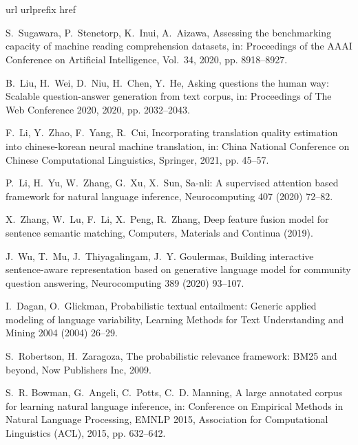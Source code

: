 \documentclass[review]{elsarticle}
\begin{document}
\section*{}
\begin{thebibliography}{10}
\expandafter\ifx\csname url\endcsname\relax
  \def\url#1{\texttt{#1}}\fi
\expandafter\ifx\csname urlprefix\endcsname\relax\def\urlprefix{URL }\fi
\expandafter\ifx\csname href\endcsname\relax
  \def\href#1#2{#2} \def\path#1{#1}\fi

S.~Sugawara, P.~Stenetorp, K.~Inui, A.~Aizawa, Assessing the benchmarking
  capacity of machine reading comprehension datasets, in: Proceedings of the
  AAAI Conference on Artificial Intelligence, Vol.~34, 2020, pp. 8918--8927.

B.~Liu, H.~Wei, D.~Niu, H.~Chen, Y.~He, Asking questions the human way:
  Scalable question-answer generation from text corpus, in: Proceedings of The
  Web Conference 2020, 2020, pp. 2032--2043.

F.~Li, Y.~Zhao, F.~Yang, R.~Cui, Incorporating translation quality estimation
  into chinese-korean neural machine translation, in: China National Conference
  on Chinese Computational Linguistics, Springer, 2021, pp. 45--57.

P.~Li, H.~Yu, W.~Zhang, G.~Xu, X.~Sun, Sa-nli: A supervised attention based
  framework for natural language inference, Neurocomputing 407 (2020) 72--82.

X.~Zhang, W.~Lu, F.~Li, X.~Peng, R.~Zhang, Deep feature fusion model for
  sentence semantic matching, Computers, Materials and Continua (2019).

J.~Wu, T.~Mu, J.~Thiyagalingam, J.~Y. Goulermas, Building interactive
  sentence-aware representation based on generative language model for
  community question answering, Neurocomputing 389 (2020) 93--107.

I.~Dagan, O.~Glickman, Probabilistic textual entailment: Generic applied
  modeling of language variability, Learning Methods for Text Understanding and
  Mining 2004 (2004) 26--29.

S.~Robertson, H.~Zaragoza, The probabilistic relevance framework: BM25 and
  beyond, Now Publishers Inc, 2009.

S.~R. Bowman, G.~Angeli, C.~Potts, C.~D. Manning, A large annotated corpus for
  learning natural language inference, in: Conference on Empirical Methods in
  Natural Language Processing, EMNLP 2015, Association for Computational
  Linguistics (ACL), 2015, pp. 632--642.


\end{thebibliography}
\end{document}
